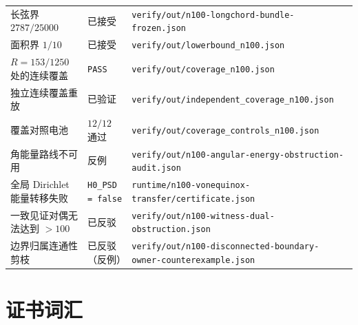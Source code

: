 {\begin{longtable}{@{}@{}>{\raggedright\arraybackslash}p{}>{\raggedright\arraybackslash}p{}>{\raggedright\arraybackslash}p{}@{}}
长弦界 $2787/25000$ & 已接受 &
\texttt{verify/\allowbreak{}out/\allowbreak{}n100-\allowbreak{}longchord-\allowbreak{}bundle-\allowbreak{}frozen.json} \\
面积界 $1/10$ & 已接受 & \texttt{verify/\allowbreak{}out/\allowbreak{}lowerbound\_\allowbreak{}n100.json} \\
$R=153/1250$ 处的连续覆盖 & \texttt{PASS} &
\texttt{verify/\allowbreak{}out/\allowbreak{}coverage\_\allowbreak{}n100.json} \\
独立连续覆盖重放 & 已验证 &
\texttt{verify/\allowbreak{}out/\allowbreak{}independent\_\allowbreak{}coverage\_\allowbreak{}n100.json} \\
覆盖对照电池 & $12/12$ 通过 &
\texttt{verify/\allowbreak{}out/\allowbreak{}coverage\_\allowbreak{}controls\_\allowbreak{}n100.json} \\
角能量路线不可用 & 反例 & {\footnotesize\texttt{verify/\allowbreak{}out/\allowbreak{}n100-\allowbreak{}angular-\allowbreak{}energy-\allowbreak{}obstruction-\allowbreak{}audit.json}} \\
全局 Dirichlet 能量转移失败 & \texttt{H0\_\allowbreak{}PSD = false} &
\texttt{runtime/\allowbreak{}n100-\allowbreak{}vonequinox-\allowbreak{}transfer/\allowbreak{}certificate.json} \\
一致见证对偶无法达到 $>100$ & 已反驳 &
{\footnotesize\texttt{verify/\allowbreak{}out/\allowbreak{}n100-\allowbreak{}witness-\allowbreak{}dual-\allowbreak{}obstruction.json}} \\
边界归属连通性剪枝 & 已反驳（反例） &
{\footnotesize\texttt{verify/\allowbreak{}out/\allowbreak{}n100-\allowbreak{}disconnected-\allowbreak{}boundary-\allowbreak{}owner-\allowbreak{}counterexample.json}} \\
\end{longtable}}


\section{证书词汇}

